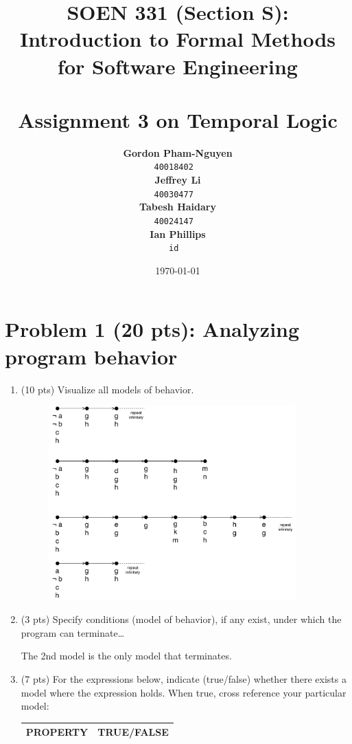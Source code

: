 \documentclass[12pt]{article}
\title{SOEN 331 (Section S): Introduction to Formal Methods\\for Software Engineering\\
\ \\
Assignment 3 on Temporal Logic}
\author{\textbf{Gordon Pham-Nguyen}\\
		\texttt{40018402}
\ \\
\textbf{Jeffrey Li}\\
		\texttt{40030477}
\ \\
\textbf{Tabesh Haidary}\\
		\texttt{40024147}
\ \\
\textbf{Ian Phillips}\\
		\texttt{id}
\ \\
}
\date{\today}
\begin{document}
\maketitle

\newpage

\section*{Problem 1 (20 pts):  Analyzing program behavior}

\begin{enumerate}

\item (10 pts) Visualize all models of behavior.

\begin{figure}[h!]
  \centering
  \includegraphics[width=0.9\textwidth]{figures/1_1.pdf}
 \end{figure}

\item (3 pts) Specify conditions (model of behavior), if any exist, under which the program can terminate\dots

The 2nd model is the only model that terminates.

\item (7 pts) For the expressions below, indicate (true/false) whether there exists a
model where the expression holds. When true, cross reference your particular model:

\begin{table}
\centering
\begin{tabular}{|l|l|}
\hline
\textbf{PROPERTY}							& \textbf{TRUE/FALSE}\\
\hline


\end{tabular}
\end{table}
\end{enumerate}
\end{document}
